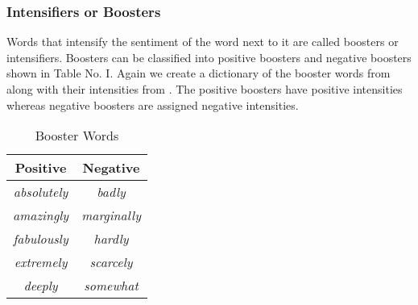 \documentclass[conference]{IEEEtran}
\begin{document}
\subsubsection{Intensifiers or Boosters}
Words that intensify the sentiment of the word next to it are called boosters or intensifiers. Boosters can be classified into positive boosters  and negative boosters shown in Table No. I. Again we create a dictionary of the booster words from \cite{c16} along with their intensities from \cite{c1}. The positive boosters have positive intensities whereas negative boosters are assigned negative intensities.
\begin{table}[h!]
	\caption{Booster Words}
	\begin{center}
		\begin{tabular}{ |c|c| } 
			
			\hline
			\textbf{Positive} & \textbf{Negative}  \\ 
			\hline
			\textit{absolutely} & \textit{badly}  \\ 
			\hline
			\textit{amazingly} & \textit{marginally}  \\ 
			\hline
			\textit{fabulously} & \textit{hardly}  \\ 
			\hline
			\textit{extremely} & \textit{scarcely}  \\ 
			\hline
			\textit{deeply} & \textit{somewhat}  \\ 
			\hline
		\end{tabular}	
	\end{center}
	
\end{table}
\end{document}
